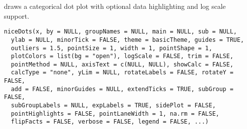 \documentclass[a4paper]{book}
\begin{document}
%
\begin{Description}\relax
draws a categorical dot plot with optional data highlighting and log scale support.
\end{Description}
%
\begin{Usage}
\begin{verbatim}
niceDots(x, by = NULL, groupNames = NULL, main = NULL, sub = NULL,
  ylab = NULL, minorTick = FALSE, theme = basicTheme, guides = TRUE,
  outliers = 1.5, pointSize = 1, width = 1, pointShape = 1,
  plotColors = list(bg = "open"), logScale = FALSE, trim = FALSE,
  pointMethod = NULL, axisText = c(NULL, NULL), showCalc = FALSE,
  calcType = "none", yLim = NULL, rotateLabels = FALSE, rotateY = FALSE,
  add = FALSE, minorGuides = NULL, extendTicks = TRUE, subGroup = FALSE,
  subGroupLabels = NULL, expLabels = TRUE, sidePlot = FALSE,
  pointHighlights = FALSE, pointLaneWidth = 1, na.rm = FALSE,
  flipFacts = FALSE, verbose = FALSE, legend = FALSE, ...)
\end{verbatim}
\end{Usage}
%
\end{document}
